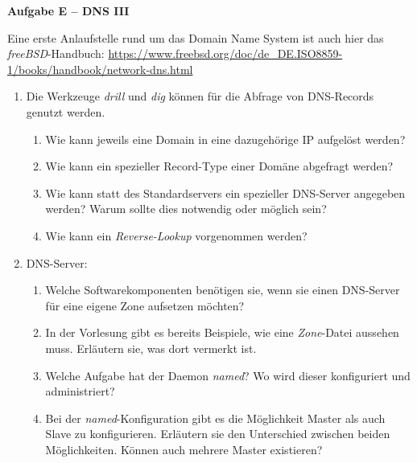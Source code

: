 \documentclass[paper=a4,fontsize=11pt]{scrartcl}%
\numberwithin{equation}{section}
\begin{document}
\begin{center}
\Large{\textbf{Aufgabe E -- DNS III}}
\end{center}
Eine erste Anlaufstelle rund um das Domain Name System ist auch hier das \emph{freeBSD}-Handbuch: \url{https://www.freebsd.org/doc/de_DE.ISO8859-1/books/handbook/network-dns.html}
\begin{enumerate}
	\item Die Werkzeuge \emph{drill} und \emph{dig} können für die Abfrage von DNS-Records genutzt werden.
	\begin{enumerate}
		\item Wie kann jeweils eine Domain in eine dazugehörige IP aufgelöst werden?
		\item Wie kann ein spezieller Record-Type einer Domäne abgefragt werden?
		\item Wie kann statt des Standardservers ein spezieller DNS-Server angegeben werden? Warum sollte dies notwendig oder möglich sein?
		\item Wie kann ein \emph{Reverse-Lookup} vorgenommen werden?
	\end{enumerate}
	\item DNS-Server:
	\begin{enumerate}
		\item Welche Softwarekomponenten benötigen sie, wenn sie einen DNS-Server für eine eigene Zone aufsetzen möchten?
		\item In der Vorlesung gibt es bereits Beispiele, wie eine \emph{Zone}-Datei aussehen muss. Erläutern sie, was dort vermerkt ist.
		\item Welche Aufgabe hat der Daemon \emph{named}? Wo wird dieser konfiguriert und administriert?
		\item Bei der \emph{named}-Konfiguration gibt es die Möglichkeit Master als auch Slave zu konfigurieren. Erläutern sie den Unterschied zwischen beiden Möglichkeiten. Können auch mehrere Master existieren? 
	\end{enumerate}
\end{enumerate}
\end{document}
